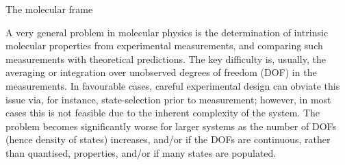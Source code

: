 The molecular frame

A very general problem in molecular physics is the determination of intrinsic molecular properties from experimental measurements, and comparing such measurements with theoretical predictions. The key difficulty is, usually, the averaging or integration over unobserved degrees of freedom (DOF) in the measurements. In favourable cases, careful experimental design can obviate this issue via, for instance, state-selection prior to measurement; however, in most cases this is not feasible due to the inherent complexity of the system. The problem becomes significantly worse for larger systems as the number of DOFs (hence density of states) increases, and/or if the DOFs are continuous, rather than quantised, properties, and/or if many states are populated.